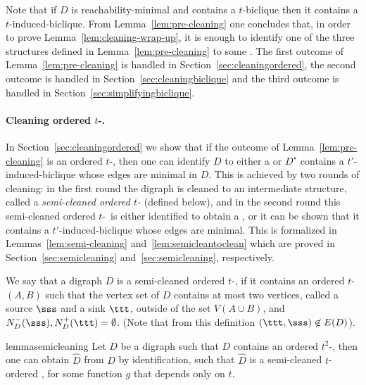 Note that if $D$ is reachability-minimal and contains a $t$-biclique then it contains a $t$-induced-biclique. 
From Lemma~\ref{lem:pre-cleaning} one concludes that, in order to prove Lemma~\ref{lem:cleaning-wrap-up}, it is enough to identify one of the three structures defined in Lemma~\ref{lem:pre-cleaning} to some . The first outcome of Lemma~\ref{lem:pre-cleaning} is handled in Section~\ref{sec:cleaningordered}, the second outcome is handled in Section~\ref{sec:cleaningbiclique} and the third outcome is handled in Section~\ref{sec:simplifyingbiclique}.

\paragraph*{Cleaning ordered $t$-\toughpair.} In Section~\ref{sec:cleaningordered} we show that if the outcome of Lemma~\ref{lem:pre-cleaning} is an ordered $t$-\toughpair, then one can identify $D$ to either a  or $D^{\star}$ contains a $t'$-induced-biclique whose edges are minimal in $D$. 
This is achieved by two rounds of cleaning: in the first round the digraph is cleaned to an intermediate structure, called a {\em semi-cleaned ordered $t$-\toughpair} (defined below), and in the second round this semi-cleaned ordered $t$-\toughpair\ is either identified to obtain a , or it can be shown that it contains a $t'$-induced-biclique whose edges are minimal.
This is formalized in Lemmas~\ref{lem:semi-cleaning} and~\ref{lem:semicleantoclean} which are proved in Section~\ref{sec:semicleaning} and~\ref{sec:semicleaning}, respectively.

\begin{definition}
We say that a digraph $D$ is a semi-cleaned ordered $t$-\toughpair, if it contains an ordered $t$-\toughpair\ $(A,B)$ such that the vertex set of $D$ contains at most two vertices, called a source $\sss$ and a sink $\ttt$, outside of the set $V(A \cup B)$, and $N^-_D(\sss), N^+_D(\ttt) =\emptyset$. (Note that from this definition $(\ttt,\sss) \not \in E(D)$).
\end{definition}

\begin{restatable}{lemma}{semicleaning}\label{lem:semi-cleaning}
Let $D$ be a
digraph such that $D$ contains an ordered $t^2$-\toughpair, then one can obtain $\widehat{D}$ from $D$ by identification, such that $\widehat{D}$ is a semi-cleaned $t$-ordered \toughpair, for some function $g$ that depends only on $t$.
\end{restatable}

